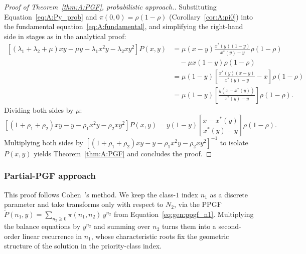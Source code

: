 \begin{proof}[Proof of Theorem~\ref{thm:A:PGF}, probabilistic approach.]
    Substituting Equation~\eqref{eq:A:Py_prob} and $\pi(0,0)=\rho(1-\rho)$ (Corollary~\ref{cor:A:pi0})
    into the fundamental equation~\eqref{eq:A:fundamental}, and simplifying the right-hand
    side in stages as in the analytical proof:
    \begin{align*}
            \left[ (\lambda_1+\lambda_2+\mu)xy - \mu y - \lambda_1 x^2y - \lambda_2 xy^2 \right] P(x,y)
            &= \mu(x-y) \frac{x^*(y)(1-y)}{x^*(y)-y} \rho(1-\rho) \\
            &\quad - \mu x(1-y) \rho(1-\rho) \\
            &= \mu(1-y) \left[ \frac{x^*(y)(x-y)}{x^*(y)-y} - x \right] \rho(1-\rho) \\
            &= \mu(1-y) \left[ \frac{y(x-x^*(y))}{x^*(y)-y} \right] \rho(1-\rho).
    \end{align*}
    Dividing both sides by $\mu$:
    \begin{equation*}
            \left[ (1+\rho_1+\rho_2)xy - y - \rho_1 x^2y - \rho_2 xy^2 \right] P(x,y)
            = y(1-y) \left[ \frac{x-x^*(y)}{x^*(y)-y} \right] \rho(1-\rho).
    \end{equation*}
    Multiplying both sides by $\left[ (1+\rho_1+\rho_2)xy - y - \rho_1 x^2y - \rho_2 xy^2 \right]^{-1}$
    to isolate $P(x,y)$ yields Theorem~\ref{thm:A:PGF} and concludes the proof.
\end{proof}


\subsubsection{Partial-PGF approach}

This proof follows Cohen~\cite{cohen1956delay}'s method. We keep the class-$1$
index $n_1$ as a discrete parameter and take transforms only with respect
to $N_2$, via the PPGF $\widetilde{P}(n_1,y)=\sum_{n_2\geq0}\pi(n_1,n_2)\,y^{n_2}$
from Equation~\eqref{eq:gen:ppgf_n1}. Multiplying the balance equations by $y^{n_2}$ and
summing over $n_2$ turns them into a second-order linear
recurrence in $n_1$, whose characteristic roots fix the geometric structure of the
solution in the priority-class index.

